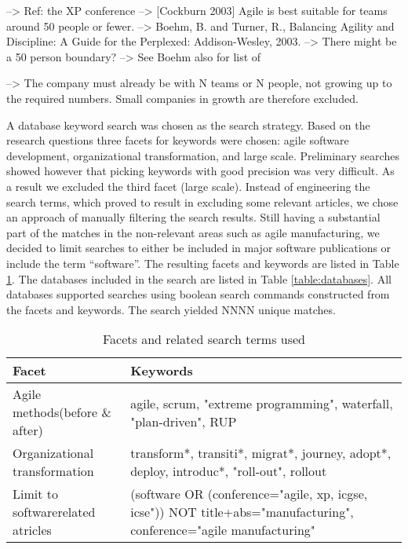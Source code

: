 \documentclass[preprint,authoryear,12pt]{elsarticle}
\begin{document}
--> Ref: the XP conference
--> [Cockburn 2003] Agile is best suitable for teams around 50 people or fewer.
--> Boehm, B. and Turner, R., Balancing Agility and Discipline: A Guide for the
    Perplexed: Addison-Wesley, 2003. --> There might be a 50 person boundary?
    --> See Boehm also for list of 

--> The company must already be with N teams or N people, not growing up to the
    required numbers. Small companies in growth are therefore excluded. 

A database keyword search was chosen as the search strategy. Based on the
research questions three facets for keywords were chosen: agile software
development, organizational transformation, and large scale. Preliminary
searches showed however that picking keywords with good precision was very
difficult. As a result we excluded the third facet (large scale). Instead of
engineering the search terms, which proved to result in excluding some
relevant articles, we chose an approach of manually filtering the search
results. Still having a substantial part of the matches in the non-relevant  
areas such as agile manufacturing, we decided to limit searches to either be
included in major software publications or include the term ``software''. The
resulting facets and keywords are listed in Table \ref{table:searchterms}. The
databases included in the search are listed in Table \ref{table:databases}. All
databases supported searches using boolean search commands constructed from the
facets and keywords. The search yielded NNNN unique matches.

\begin{table}
    \begin{tabular}{ p{} p{} }
        \toprule
        Facet                  & Keywords   \\
        \midrule
        Agile methods\newline (before \& after) &
            agile, scrum, "extreme programming",\newline
            waterfall, "plan-driven", RUP \\
        Organizational transformation &
            transform*, transiti*, migrat*, journey, adopt*, deploy, introduc*,
            "roll-out", rollout \\
        Limit to software\newline related atricles &
            (software OR (conference="agile, xp, icgse, icse"))\newline
            NOT title+abs="manufacturing", conference="agile manufacturing"
        \\
        \bottomrule
    \end{tabular}
    \caption{Facets and related search terms used}
    \label{table:searchterms}
\end{table}
\end{document}
